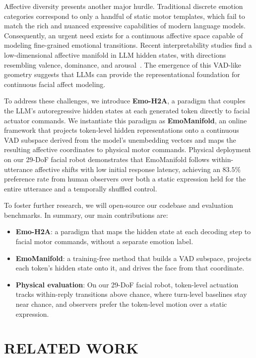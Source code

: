 \documentclass[letterpaper, 10 pt, conference]{ieeeconf/ieeeconf}
\begin{document}
Affective diversity presents another major hurdle. Traditional discrete emotion categories correspond to only a handful of static motor templates, which fail to match the rich and nuanced expressive capabilities of modern language models. Consequently, an urgent need exists for a continuous affective space capable of modeling fine-grained emotional transitions. Recent interpretability studies find a low-dimensional affective manifold in LLM hidden states, with directions resembling valence, dominance, and arousal~\cite{reichman2026emotions}. The emergence of this VAD-like geometry suggests that LLMs can provide the representational foundation for continuous facial affect modeling.

To address these challenges, we introduce \textbf{Emo-H2A}, a paradigm that couples the LLM's autoregressive hidden states at each generated token directly to facial actuator commands. We instantiate this paradigm as \textbf{EmoManifold}, an online framework that projects token-level hidden representations onto a continuous VAD subspace derived from the model's unembedding vectors and maps the resulting affective coordinates to physical motor commands. Physical deployment on our 29-DoF facial robot demonstrates that EmoManifold follows within-utterance affective shifts with low initial response latency, achieving an $83.5\%$ preference rate from human observers over both a static expression held for the entire utterance and a temporally shuffled control.

To foster further research, we will open-source our codebase and evaluation benchmarks. In summary, our main contributions are:
\begin{itemize}
\item \textbf{Emo-H2A}: a paradigm that maps the hidden state at each decoding step to facial motor commands, without a separate emotion label.
\item \textbf{EmoManifold}: a training-free method that builds a VAD subspace, projects each token's hidden state onto it, and drives the face from that coordinate.
\item \textbf{Physical evaluation}: On our 29-DoF facial robot, token-level actuation tracks within-reply transitions above chance, where turn-level baselines stay near chance, and observers prefer the token-level motion over a static expression.
\end{itemize}

\section{RELATED WORK}
\label{sec:related}
\end{document}
